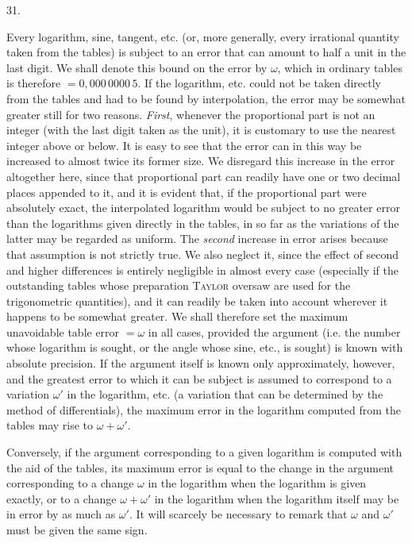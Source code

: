 \par{}
\begin{center}
\hypertarget{native-046-article031}{}31.
\end{center}
Every logarithm, sine, tangent, etc. (or, more generally, every irrational quantity taken from the tables) is subject to an error that can amount to half a unit in the last digit. We shall denote this bound on the error by $\omega$, which in ordinary tables is therefore $=0{,}000\,0000\,5$. If the logarithm, etc. could not be taken directly from the tables and had to be found by interpolation, the error may be somewhat greater still for two reasons. \emph{First}, whenever the proportional part is not an integer (with the last digit taken as the unit), it is customary to use the nearest integer above or below. It is easy to see that the error can in this way be increased to almost twice its former size. We disregard this increase in the error altogether here, since that proportional part can readily have one or two decimal places appended to it, and it is evident that, if the proportional part were absolutely exact, the interpolated logarithm would be subject to no greater error than the logarithms given directly in the tables, in so far as the variations of the latter may be regarded as uniform. The \emph{second} increase in error arises because that assumption is not strictly true. We also neglect it, since the effect of second and higher differences is entirely negligible in almost every case (especially if the outstanding tables whose preparation \textsc{Taylor} oversaw are used for the trigonometric quantities), and it can readily be taken into account wherever it happens to be somewhat greater. We shall therefore set the maximum unavoidable table error $=\omega$ in all cases, provided the argument (i.e. the number whose logarithm is sought, or the angle whose sine, etc., is sought) is known with absolute precision. If the argument itself is known only approximately, however, and the greatest error to which it can be subject is assumed to correspond to a variation $\omega'$ in the logarithm, etc. (a variation that can be determined by the method of differentials), the maximum error in the logarithm computed from the tables may rise to $\omega+\omega'$.

Conversely, if the argument corresponding to a given logarithm is computed with the aid of the tables, its maximum error is equal to the change in the argument corresponding to a change $\omega$ in the logarithm when the logarithm is given exactly, or to a change $\omega+\omega'$ in the logarithm when the logarithm itself may be in error by as much as $\omega'$. It will scarcely be necessary to remark that $\omega$ and $\omega'$ must be given the same sign.

